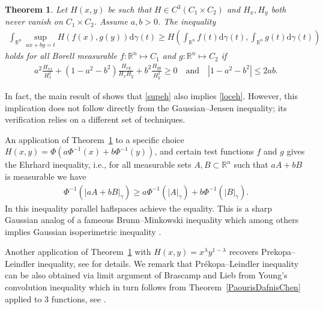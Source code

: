 \documentclass[9pt, a4paper]{amsart}
\newcommand{\1}{{\chi_{}}}%
\newtheorem{atheorem}{Theorem}[section]
\numberwithin{equation}{section}
\begin{document}
\begin{atheorem}\label{genehrhard}
  Let $H(x,y)$ be such that  $H \in C^{3}(C_{1}\times C_{2})$ and $H_{x}, H_{y}$ both never vanish on $C_{1}\times C_{2}$. Assume $a, b >0$. The inequality 
    \begin{align} \label{supeh}
        \int_{\mathbb{R}^{n}} \sup_{ax+by=t} H(f(x), g(y)) \mathrm{d}\gamma(t) \geq H\left(\int_{\mathbb{R}^{n}} f(t) \mathrm{d}\gamma(t), \int_{\mathbb{R}^{n}} g(t)\mathrm{d}\gamma(t) \right)
    \end{align}
    holds for all Borell measurable $f : \mathbb{R}^{n} \mapsto C_{1}$ and $g : \mathbb{R}^{n} \mapsto C_{2}$ if  
    \begin{align}\label{loceh}
        a^{2} \frac{H_{xx}}{H_{x}^{2}} + (1-a^{2}-b^{2})\frac{H_{xy}}{H_{x}H_{y}} + b^{2} \frac{H_{yy}}{H_{y}^{2}}\geq 0\quad \text{and} \quad  |1-a^{2}-b^{2}|\leq 2ab.
    \end{align}
\end{atheorem}

In fact, the main result of \cite{IvanisviliEhrhard} shows that \eqref{supeh} also implies \eqref{loceh}. However, this implication does not follow directly from the Gaussian--Jensen inequality; its verification relies on a different set of techniques.




An application of Theorem~\ref{genehrhard} to a specific choice $H(x,y) = \Phi(a\Phi^{-1}(x)+b\Phi^{-1}(y))$, and certain test functions $f$ and $g$ gives the Ehrhard inequality,  i.e.,  for all measurable sets $A, B \subset \mathbb{R}^{n}$ such that $aA+bB$ is measurable we have 
\begin{align*}
 \Phi^{-1}(|aA+bB|_{\gamma}) \geq a\Phi^{-1}(|A|_{\gamma})+b\Phi^{-1}(|B|_{\gamma}).   
\end{align*}
In this inequality parallel haflspaces achieve  the equality. This is a sharp Gaussian analog of a fameous Brunn--Minkowski inequality which among others implies Gaussian isoperimetric inequality \cite{IvanVol15}. 

Another application of Theorem~\ref{genehrhard} with $H(x,y)=x^{\lambda}y^{1-\lambda}$ recovers Prekopa--Leindler inequality, see \cite{IvanisviliEhrhard} for details. We remark that Pr\'ekopa--Leindler inequality can be also obtained via limit argument of Brascamp and Lieb \cite{BrascampLieb766} from Young's convolution inequality which in turn follows from Theorem~\ref{PaourisDafnisChen} applied to 3 functions, see \cite{ChenPaourDafn}.
\end{document}
